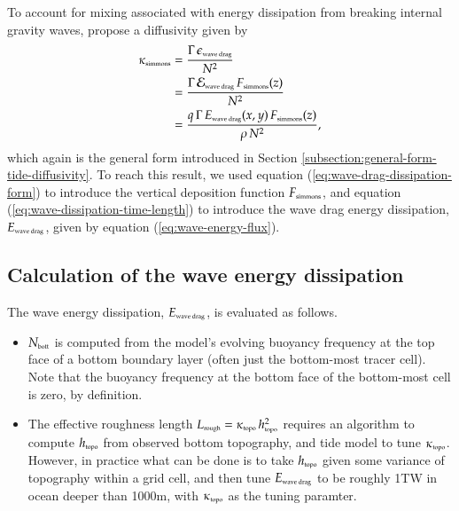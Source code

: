 To account for mixing associated with energy dissipation from breaking
internal gravity waves, \cite{Simmonsetal2004} propose a diffusivity
given by
\begin{equation}
\begin{split}
 \kappa_{\mbox{\tiny simmons}} &= 
 \frac{\Gamma \, \epsilon_{\mbox{\tiny wave drag}}}{N^{2}}
\\
 &= \frac{\Gamma \, {\cal E}_{\mbox{\tiny wave drag}} \, F_{\mbox{\tiny simmons}}(z)}{N^{2}}
\\
 &=
 \frac{q \, \Gamma \, E_{\mbox{\tiny wave drag}}(x,y) \,  F_{\mbox{\tiny simmons}}(z) }  {\rho \, N^2},
\end{split}
\label{eq:wave-vert-kappa-simmons}
\end{equation}
which again is the general form introduced in Section
\ref{subsection:general-form-tide-diffusivity}.  To reach this result,
we used equation (\ref{eq:wave-drag-dissipation-form}) to introduce
the vertical deposition function $F_{\mbox{\tiny simmons}}$, and
equation (\ref{eq:wave-dissipation-time-length}) to introduce the wave
drag energy dissipation, $E_{\mbox{\tiny wave drag}}$, given by
equation (\ref{eq:wave-energy-flux}).


\subsection{Calculation of the wave energy dissipation} 
\label{subsection:wave-drag-details-simmons}

The wave energy dissipation, $E_{\mbox{\tiny wave drag}}$, is
evaluated as follows.
\begin{itemize}

\item $N_{\mbox{\tiny bott}}$ is computed from the model's evolving
  buoyancy frequency at the top face of a bottom boundary layer (often
  just the bottom-most tracer cell).  Note that the buoyancy frequency
  at the bottom face of the bottom-most cell is zero, by definition.

\item The effective roughness length $L_{\mbox{\tiny rough}} =
  \kappa_{\mbox{\tiny topo}} \, h_{\mbox{\tiny topo}}^{2}$ requires an
  algorithm to compute $h_{\mbox{\tiny topo}}$ from observed bottom
  topography, and tide model to tune $\kappa_{\mbox{\tiny topo}}$.
  However, in practice what can be done is to take $h_{\mbox{\tiny
      topo}}$ given some variance of topography within a grid cell,
  and then tune $E_{\mbox{\tiny wave drag}}$ to be roughly 1TW in
  ocean deeper than 1000m, with $\kappa_{\mbox{\tiny topo}}$ as the
  tuning paramter.

\end{itemize}


